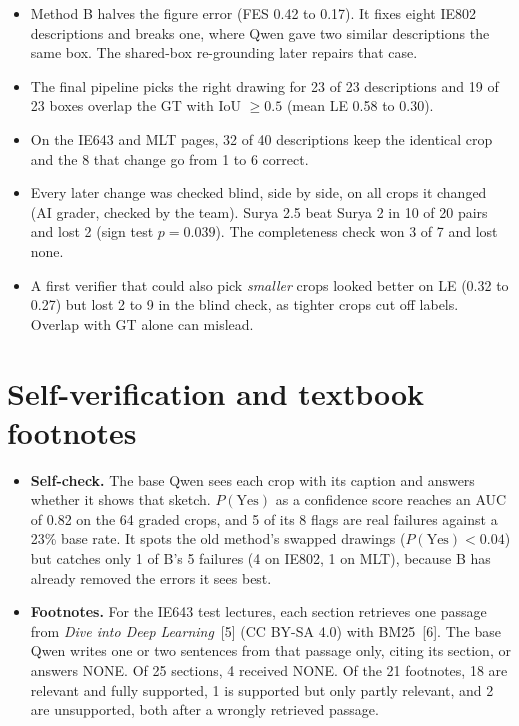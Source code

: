 \documentclass[11pt,a4paper]{article}
\begin{document}
\begin{itemize}
\item Method B halves the figure error (FES 0.42 to 0.17). It fixes eight IE802 descriptions and breaks one,
where Qwen gave two similar descriptions the same box. The shared-box re-grounding later repairs that case.
\item The final pipeline picks the right drawing for 23 of 23 descriptions and 19 of 23 boxes overlap the GT
with IoU $\ge 0.5$ (mean LE 0.58 to 0.30).
\item On the IE643 and MLT pages, 32 of 40 descriptions keep the identical crop and the 8 that change go from
1 to 6 correct.
\item Every later change was checked blind, side by side, on all crops it changed (AI grader, checked by the
team). Surya 2.5 beat Surya 2 in 10 of 20 pairs and lost 2 (sign test $p=0.039$). The completeness check won
3 of 7 and lost none.
\item A first verifier that could also pick \emph{smaller} crops looked better on LE (0.32 to 0.27) but lost
2 to 9 in the blind check, as tighter crops cut off labels. Overlap with GT alone can mislead.
\end{itemize}

\section{Self-verification and textbook footnotes}
\begin{itemize}
\item \textbf{Self-check.} The base Qwen sees each crop with its caption and answers whether it shows that
sketch. $P(\text{Yes})$ as a confidence score reaches an AUC of 0.82 on the 64 graded crops, and 5 of its 8
flags are real failures against a 23\% base rate. It spots the old method's swapped drawings ($P(\text{Yes})<0.04$) but catches only 1 of B's 5 failures
(4 on IE802, 1 on MLT), because B has already removed the errors it sees best.
\item \textbf{Footnotes.} For the IE643 test lectures, each section retrieves one passage from \emph{Dive into
Deep Learning}~[5] (CC BY-SA 4.0) with BM25~[6]. The base Qwen writes one or two sentences from that passage
only, citing its section, or answers NONE. Of 25 sections, 4 received NONE. Of the 21 footnotes, 18 are relevant and fully supported, 1 is
supported but only partly relevant, and 2 are unsupported, both after a wrongly retrieved passage.
\end{itemize}
\end{document}
